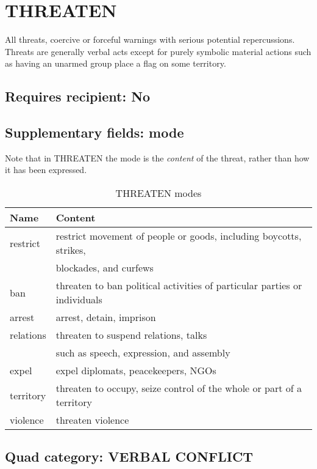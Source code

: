 \documentclass[11pt]{report}
\newcommand{\plcat}[1]{\textsf{#1}}
\newcommand{\ti}[1]{\textit{#1}}
\begin{document}
\newpage  


\section{THREATEN}

All threats, coercive or forceful warnings with serious potential repercussions. Threats are generally verbal acts except for purely symbolic material actions such as having an unarmed group place a flag on some territory. 
\subsection{Requires recipient: No}

\subsection{Supplementary fields: mode}

Note that in \plcat{THREATEN} the mode is the \ti{content} of the threat, rather than how it has been expressed.

\begin{table}[htp]
\caption{THREATEN modes}
\begin{center}
\begin{tabular}{|l|l|}
\hline
Name & Content \\
\hline
restrict & restrict movement of people or goods, including boycotts, strikes,  \\
& blockades, and curfews \\
ban & threaten to ban political activities of particular parties or individuals \\
arrest & arrest, detain, imprison \\
relations & threaten to suspend relations, talks \\
& such as speech, expression, and assembly\\
expel & expel diplomats, peacekeepers, NGOs \\
territory & threaten to occupy, seize control of the whole or part of a territory \\
violence & threaten violence \\
\hline
\end{tabular}
\end{center}
\label{tab:threatmode}
\end{table}%
 
\subsection{Quad category: VERBAL CONFLICT}
\end{document}
